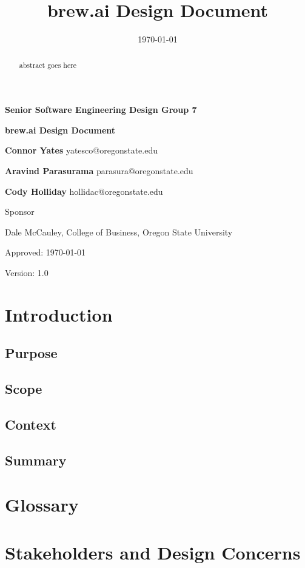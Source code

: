 \documentclass[draftclsnofoot,onecolumn,letterpaper,10pt]{IEEEtran}
\date{\today}
\title{brew.ai Design Document}
\begin{document}
{\huge\textbf{Senior Software Engineering Design Group 7}}
	\vspace{1cm}

{\Huge\textbf{brew.ai Design Document}}

\vspace{2cm}
\textbf{Connor Yates} yatesco@oregonstate.edu

\textbf{Aravind Parasurama} parasura@oregonstate.edu

\textbf{Cody Holliday} hollidac@oregonstate.edu

\vspace{2cm}
Sponsor

Dale McCauley, College of Business, Oregon State University

\vspace{0.5cm}
	Approved: \today{}

	Version: 1.0


\newpage
\begin{abstract}
	abstract goes here
\end{abstract}
\newpage
\tableofcontents
\newpage
\section{Introduction}
\subsection{Purpose}
\subsection{Scope}
\subsection{Context}
\subsection{Summary}

\section{Glossary}

\section{Stakeholders and Design Concerns}
\end{document}

